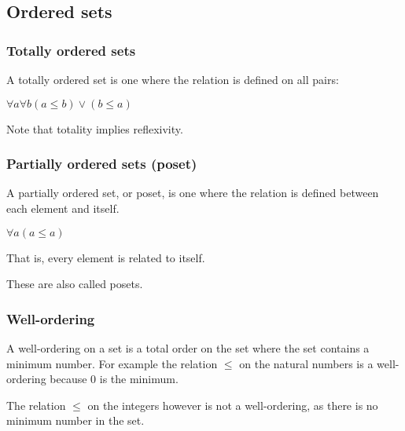 
\subsection{Ordered sets}

\subsubsection{Totally ordered sets}

A totally ordered set is one where the relation is defined on all pairs:

\(\forall a \forall b	(a\le b)\lor (b\le a)\)

Note that totality implies reflexivity.

\subsubsection{Partially ordered sets (poset)}

A partially ordered set, or poset, is one where the relation is defined between each element and itself.

\(\forall a (a\le a)\)

That is, every element is related to itself.

These are also called posets.

\subsubsection{Well-ordering}

A well-ordering on a set is a total order on the set where the set contains a minimum number. For example the relation \(\le \) on the natural numbers is a well-ordering because \(0\) is the minimum.

The relation \(\le \) on the integers however is not a well-ordering, as there is no minimum number in the set.

